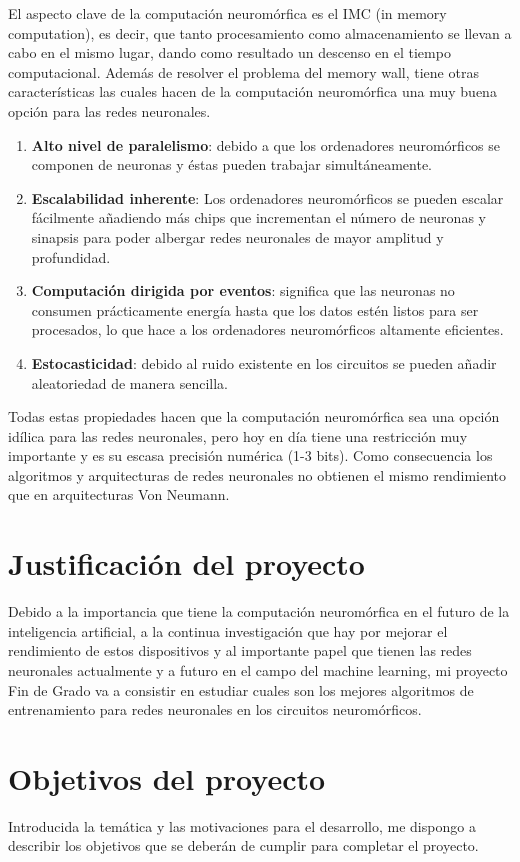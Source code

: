 El aspecto clave de la computación neuromórfica es el IMC (in memory computation), es decir, que tanto procesamiento como almacenamiento se llevan a cabo en el mismo lugar, dando como resultado un descenso en el tiempo computacional. Además de resolver el problema del memory wall, tiene otras características las cuales hacen de la computación neuromórfica una muy buena opción para las redes neuronales. 
\begin{enumerate}
    \item \textbf{Alto nivel de paralelismo}: debido a que los ordenadores neuromórficos se componen de neuronas y éstas pueden trabajar simultáneamente.
    \item \textbf{Escalabilidad inherente}: Los ordenadores neuromórficos se pueden escalar fácilmente añadiendo más chips que incrementan el número de neuronas y sinapsis para poder albergar redes neuronales de mayor amplitud y profundidad.
    \item \textbf{Computación dirigida por eventos}: significa que las neuronas no consumen prácticamente energía hasta que los datos estén listos para ser procesados, lo que hace a los ordenadores neuromórficos altamente eficientes.
    \item \textbf{Estocasticidad}: debido al ruido existente en los circuitos se pueden añadir aleatoriedad de manera sencilla.
\end{enumerate}

Todas estas propiedades hacen que la computación neuromórfica sea una opción idílica para las redes neuronales, pero hoy en día tiene una restricción muy importante y es su escasa precisión numérica (1-3 bits). Como consecuencia los algoritmos y arquitecturas de redes neuronales no obtienen el mismo rendimiento que en arquitecturas Von Neumann.

\section{Justificación del proyecto}
Debido a la importancia que tiene la computación neuromórfica en el futuro de la inteligencia artificial, a la continua investigación que hay por mejorar el rendimiento de estos dispositivos y al importante papel que tienen las redes neuronales actualmente y a futuro en el campo del machine learning, mi proyecto Fin de Grado va a consistir en estudiar cuales son los mejores algoritmos de entrenamiento para redes neuronales en los circuitos neuromórficos. 

\section{Objetivos del proyecto}
Introducida la temática y las motivaciones para el desarrollo, me dispongo a describir los objetivos que se deberán de cumplir para completar el proyecto.

